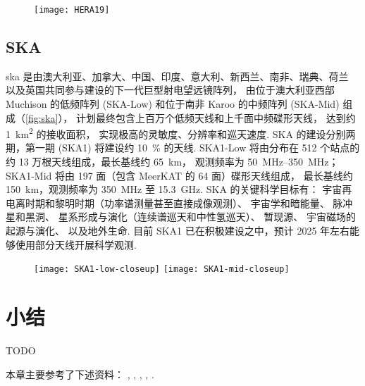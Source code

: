 \begin{figure}[htp]
  \centering
  \texttt{[image: HERA19]}
  \label{fig:hera}
\end{figure}

\subsection{SKA}

\acf{ska} 是由澳大利亚、加拿大、中国、印度、意大利、新西兰、南非、瑞典、荷兰
以及英国共同参与建设的下一代巨型射电望远镜阵列，
由位于澳大利亚西部 Muchison 的低频阵列 (SKA-Low)
和位于南非 Karoo 的中频阵列 (SKA-Mid) 组成（\autoref{fig:ska}），
计划最终包含上百万个低频天线和上千面中频碟形天线，
达到约 \SI{1}{\km\squared} 的接收面积，
实现极高的灵敏度、分辨率和巡天速度.
SKA 的建设分别两期，第一期 (SKA1) 将建设约 \SI{10}{\percent} 的天线.
SKA1-Low 将由分布在 512 个站点的约 13 万根天线组成，最长基线约 \SI{65}{\km}，
观测频率为 \SIrange{50}{350}{\MHz}；
SKA1-Mid 将由 197 面（包含 MeerKAT 的 64 面）碟形天线组成，
最长基线约 \SI{150}{\km}，观测频率为 \SI{350}{\MHz} 至 \SI{15.3}{\GHz}.
SKA 的关键科学目标有\cite{braun2015}：
宇宙再电离时期和黎明时期（功率谱测量甚至直接成像观测）\cite{mellema2013,mellema2015,koopmans2015}、
宇宙学和暗能量\cite{maartens2015,santos2015}、
脉冲星和黑洞\cite{kramer2015}、
星系形成与演化（连续谱巡天和中性氢巡天）\cite{prandoni2015,staveley2015}、
暂现源\cite{fender2015}、
宇宙磁场的起源与演化\cite{johnston2015}、
以及地外生命\cite{hoare2015}.
目前 SKA1 已在积极建设之中，预计 2025 年左右能够使用部分天线开展科学观测.

\begin{figure}[htp]
  \centering
  \texttt{[image: SKA1-low-closeup]}%
  \texttt{[image: SKA1-mid-closeup]}
  \label{fig:ska}
\end{figure}


\section{小结}

TODO

本章主要参考了下述资料：
, , ,
, .

